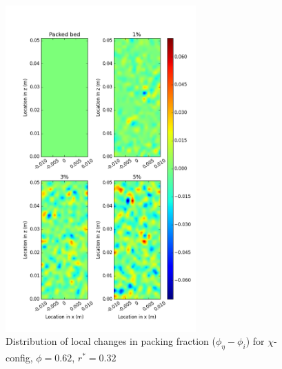 \begin{figure}[!t]
    \centering
    \includegraphics[width = 0.65\textwidth]{figures/x-62-r23-1-deltas.png}
    \caption{Distribution of local changes in packing fraction ($\phi_{\eta} - \phi_i$) for $\chi$-config, $\phi = 0.62$, $r^* = 0.32$}\label{fig:x-62-r23-deltas}
\end{figure}

